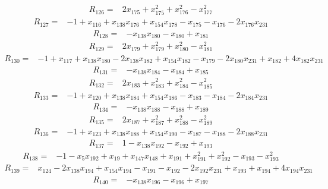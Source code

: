 \begin{align*}
 R_{126}={}&2x_{175} +x_{175}^{2} +x_{176}^{2} -x_{177}^{2}
\end{align*}
\begin{align*}
 R_{127}={}&-1 +x_{116} +x_{138}x_{176} +x_{154}x_{178} -x_{175} -x_{176} -2x_{176}x_{231}
\end{align*}
\begin{align*}
 R_{128}={}&-x_{138}x_{180} -x_{180} +x_{181}
\end{align*}
\begin{align*}
 R_{129}={}&2x_{179} +x_{179}^{2} +x_{180}^{2} -x_{181}^{2}
\end{align*}
\begin{align*}
 R_{130}={}&-1 +x_{117} +x_{138}x_{180} -2x_{138}x_{182} +x_{154}x_{182} -x_{179} -2x_{180}x_{231} +x_{182} +4x_{182}x_{231}
\end{align*}
\begin{align*}
 R_{131}={}&-x_{138}x_{184} -x_{184} +x_{185}
\end{align*}
\begin{align*}
 R_{132}={}&2x_{183} +x_{183}^{2} +x_{184}^{2} -x_{185}^{2}
\end{align*}
\begin{align*}
 R_{133}={}&-1 +x_{120} +x_{138}x_{184} +x_{154}x_{186} -x_{183} -x_{184} -2x_{184}x_{231}
\end{align*}
\begin{align*}
 R_{134}={}&-x_{138}x_{188} -x_{188} +x_{189}
\end{align*}
\begin{align*}
 R_{135}={}&2x_{187} +x_{187}^{2} +x_{188}^{2} -x_{189}^{2}
\end{align*}
\begin{align*}
 R_{136}={}&-1 +x_{123} +x_{138}x_{188} +x_{154}x_{190} -x_{187} -x_{188} -2x_{188}x_{231}
\end{align*}
\begin{align*}
 R_{137}={}&1 -x_{138}x_{192} -x_{192} +x_{193}
\end{align*}
\begin{align*}
 R_{138}={}&-1 -x_{5}x_{192} +x_{19} +x_{147}x_{148} +x_{191} +x_{191}^{2} +x_{192}^{2} -x_{193} -x_{193}^{2}
\end{align*}
\begin{align*}
 R_{139}={}&x_{124} -2x_{138}x_{194} +x_{154}x_{194} -x_{191} -x_{192} -2x_{192}x_{231} +x_{193} +x_{194} +4x_{194}x_{231}
\end{align*}
\begin{align*}
 R_{140}={}&-x_{138}x_{196} -x_{196} +x_{197}
\end{align*}
